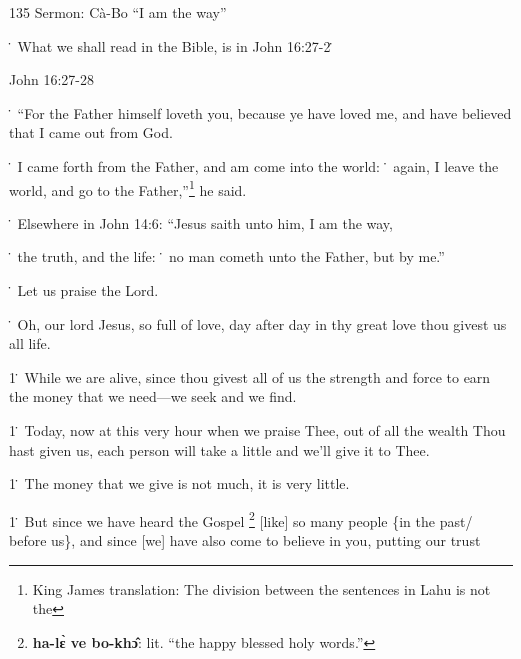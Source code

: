 
135 Sermon: Cà-Bo ``I am the way''

\. What we shall read in the Bible, is in John 16:27-2\.

John 16:27-28

\. ``For the Father himself loveth you, because ye have loved me, and have believed
that I came out from God.

\. I came forth from the Father, and am come into the world: \. again, I leave
the world, and go to the Father,''\footnote{King James translation: The division between the sentences in Lahu is not the} he said.

\. Elsewhere in John 14:6: ``Jesus saith unto him, I am the way,

\. the truth, and the life: \. no man cometh unto the Father, but by me.''

\. Let us praise the Lord.

\. Oh, our lord Jesus, so full of love, day after day in thy great love thou givest
us all life.

1\. While we are alive, since thou givest all of us the strength and force to earn
the money that we need---we seek and we find.

1\. Today, now at this very hour when we praise Thee, out of all the wealth Thou
hast given us, each person will take a little and we'll give it to Thee.

1\. The money that we give is not much, it is very little.

1\. But since we have heard the Gospel \footnote{\textbf{ha-lɛ̀ ve bo-khɔ̂}: lit. ``the happy blessed holy words.''} [like] so many people \{in the past/
before us\}, and since [we] have also come to believe in you, putting our trust
